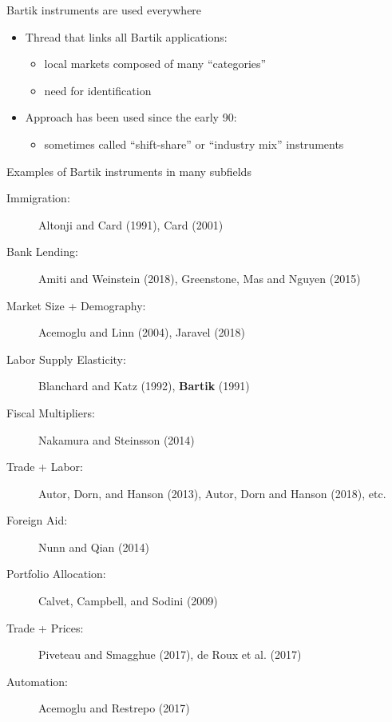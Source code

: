 \documentclass[notes,11pt, aspectratio=169]{beamer}
\begin{document}
\begin{frame}{Bartik instruments are used everywhere}
  \begin{center}
  \end{center}
  \begin{itemize}
  \item Thread that links all Bartik applications:
    \begin{itemize}
    \item local markets composed of many ``categories''
    \item need for identification
    \end{itemize}
    \smallskip
  \item Approach has been used since the early 90:
    \begin{itemize}
    \item sometimes called ``shift-share'' or ``industry mix'' instruments
    \end{itemize}
  \end{itemize}
\end{frame}

\begin{frame}{Examples of Bartik instruments in many subfields}
  \begin{description}
  \item[Immigration:] Altonji and Card (1991), Card (2001)
    \smallskip
  \item[Bank Lending:] Amiti and Weinstein (2018), Greenstone, Mas and Nguyen (2015)
    \smallskip    
  \item[Market Size + Demography:] Acemoglu and Linn (2004), Jaravel (2018)
    \smallskip    
  \item[Labor Supply Elasticity:] Blanchard and Katz (1992), \textbf{Bartik} (1991)
    \smallskip
  \item[Fiscal Multipliers:] Nakamura and Steinsson (2014)
    \smallskip    
  \item[Trade + Labor:] Autor, Dorn, and Hanson (2013), Autor, Dorn and Hanson (2018), etc. 
    \smallskip    
  \item[Foreign Aid:] Nunn and Qian (2014)
    \smallskip
  \item[Portfolio Allocation:] Calvet, Campbell, and Sodini (2009)
    \smallskip
  \item[Trade + Prices:] Piveteau and Smagghue (2017), de Roux et al. (2017)
    \smallskip    
  \item[Automation:] Acemoglu and Restrepo (2017)
  \end{description}
\end{frame}
\end{document}

